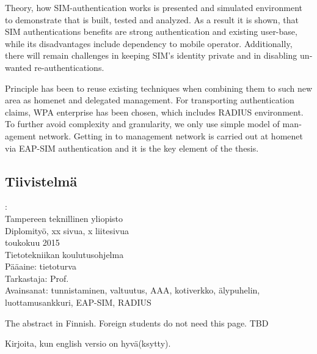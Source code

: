 \documentclass[12pt,a4paper,english]{tutthesis}
\begin{document}
\begin{otherlanguage}{english}
Theory, how SIM-authentication works is presented and simulated environment
to demonstrate that is built, tested and analyzed.
As a result it is shown, that SIM authentications benefits are strong
authentication and existing user-base, while its disadvantages include
dependency to mobile operator. Additionally, there will remain challenges in keeping SIM's identity private and in disabling unwanted re-authentications.

Principle has been to reuse existing techniques when combining them to such new area as homenet and delegated management.
 For transporting authentication claims, WPA enterprise has been chosen, which includes RADIUS environment.
To further avoid complexity and granularity, we
only use simple model of management network. Getting in to management network is carried out at homenet via EAP-SIM authentication and it is the key element of the thesis.



\end{otherlanguage} %

\begin{otherlanguage}{finnish} %
\chapter*{Tiivistelmä}         %

\begin{spacing}{1.0}
         {\bf \textsf{\MakeUppercase{\@author}}}: \@titleB\\  %
         \textsf{Tampereen teknillinen yliopisto}\\
         \textsf{Diplomityö, xx sivua, x liitesivua}\\ %
         \textsf{toukokuu 2015}\\
         \textsf{Tietotekniikan koulutusohjelma}\\
         \textsf{Pääaine: tietoturva}\\
         \textsf{Tarkastaja:  Prof. \@examiner}\\ %
         \textsf{Avainsanat: tunnistaminen, valtuutus, AAA, kotiverkko, älypuhelin, luottamusankkuri, EAP-SIM, RADIUS}\\
\end{spacing}
The abstract in Finnish. Foreign students do not need this page.
TBD

Kirjoita, kun english versio on hyvä(ksytty).
\end{otherlanguage} %
\end{document}
